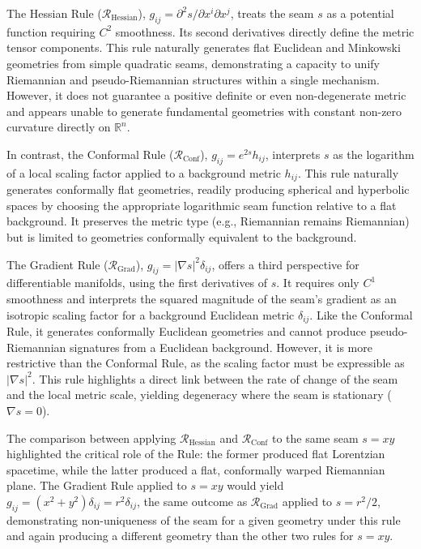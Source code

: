 \documentclass[twoside,twocolumn]{article}
\numberwithin{equation}{section} %
\begin{document}
The Hessian Rule ($\mathcal{R}_{\text{Hessian}}$), $g_{ij} = \partial^2 s / \partial x^i \partial x^j$, treats the seam $s$ as a potential function requiring $C^2$ smoothness. Its second derivatives directly define the metric tensor components. This rule naturally generates flat Euclidean and Minkowski geometries from simple quadratic seams, demonstrating a capacity to unify Riemannian and pseudo-Riemannian structures within a single mechanism. However, it does not guarantee a positive definite or even non-degenerate metric and appears unable to generate fundamental geometries with constant non-zero curvature directly on $\mathbb{R}^n$.

In contrast, the Conformal Rule ($\mathcal{R}_{\text{Conf}}$), $g_{ij} = e^{2s} h_{ij}$, interprets $s$ as the logarithm of a local scaling factor applied to a background metric $h_{ij}$. This rule naturally generates conformally flat geometries, readily producing spherical and hyperbolic spaces by choosing the appropriate logarithmic seam function relative to a flat background. It preserves the metric type (e.g., Riemannian remains Riemannian) but is limited to geometries conformally equivalent to the background.

The Gradient Rule ($\mathcal{R}_{\text{Grad}}$), $g_{ij} = |\nabla s|^2 \delta_{ij}$, offers a third perspective for differentiable manifolds, using the first derivatives of $s$. It requires only $C^1$ smoothness and interprets the squared magnitude of the seam's gradient as an isotropic scaling factor for a background Euclidean metric $\delta_{ij}$. Like the Conformal Rule, it generates conformally Euclidean geometries and cannot produce pseudo-Riemannian signatures from a Euclidean background. However, it is more restrictive than the Conformal Rule, as the scaling factor must be expressible as $|\nabla s|^2$. This rule highlights a direct link between the rate of change of the seam and the local metric scale, yielding degeneracy where the seam is stationary ($\nabla s = 0$).

The comparison between applying $\mathcal{R}_{\text{Hessian}}$ and $\mathcal{R}_{\text{Conf}}$ to the same seam $s=xy$ highlighted the critical role of the Rule: the former produced flat Lorentzian spacetime, while the latter produced a flat, conformally warped Riemannian plane. The Gradient Rule applied to $s=xy$ would yield $g_{ij} = (x^2+y^2)\delta_{ij} = r^2 \delta_{ij}$, the same outcome as $\mathcal{R}_{\text{Grad}}$ applied to $s=r^2/2$, demonstrating non-uniqueness of the seam for a given geometry under this rule and again producing a different geometry than the other two rules for $s=xy$.
\end{document}
